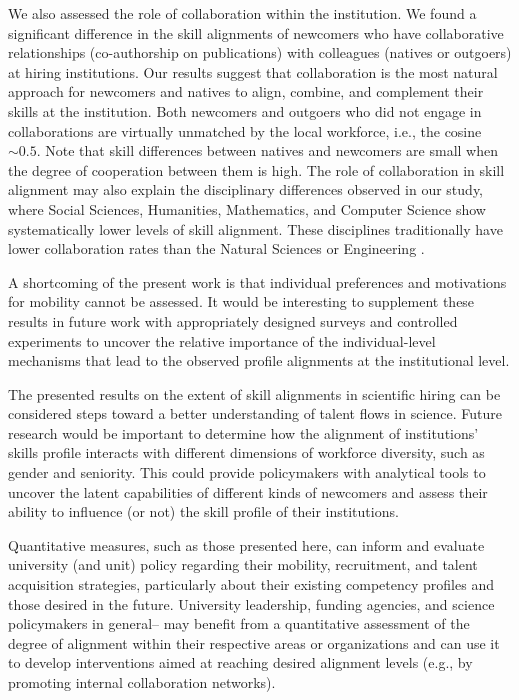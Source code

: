 \documentclass[draft,final]{vutinfth} %
\begin{document}
We also assessed the role of collaboration within the institution. We found a significant difference in the skill alignments of newcomers who have collaborative relationships (co-authorship on publications) with colleagues (natives or outgoers) at hiring institutions. Our results suggest that collaboration is the most natural approach for newcomers and natives to align, combine, and complement their skills at the institution. Both newcomers and outgoers who did not engage in collaborations are virtually unmatched by the local workforce, i.e., the cosine $\sim 0.5$. Note that skill differences between natives and newcomers are small when the degree of cooperation between them is high. The role of collaboration in skill alignment may also explain the disciplinary differences observed in our study, where Social Sciences, Humanities, Mathematics, and Computer Science show systematically lower levels of skill alignment. These disciplines traditionally have lower collaboration rates than the Natural Sciences or Engineering \cite{gazni2012mapping}.

A shortcoming of the present work is that individual preferences and motivations for mobility cannot be assessed. It would be interesting to supplement these results in future work with appropriately designed surveys and controlled experiments to uncover the relative importance of the individual-level mechanisms that lead to the observed profile alignments at the institutional level.

The presented results on the extent of skill alignments in scientific hiring can be considered steps toward a better understanding of talent flows in science. Future research would be important to determine how the alignment of institutions' skills profile interacts with different dimensions of workforce diversity, such as gender and seniority. This could provide policymakers with analytical tools to uncover the latent capabilities of different kinds of newcomers and assess their ability to influence (or not) the skill profile of their institutions.

Quantitative measures, such as those presented here, can inform and evaluate university (and unit) policy regarding their mobility, recruitment, and talent acquisition strategies, particularly about their existing competency profiles and those desired in the future. University leadership, funding agencies, and science policymakers in general-- may benefit from a quantitative assessment of the degree of alignment within their respective areas or organizations and can use it to develop interventions aimed at reaching desired alignment levels (e.g., by promoting internal collaboration networks). 
\end{document}
